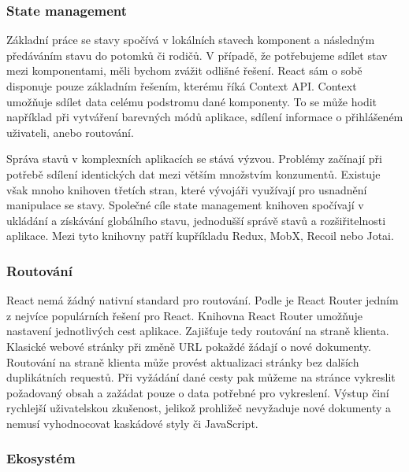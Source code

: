 \subsubsection{State management}

Základní práce se stavy spočívá v lokálních stavech komponent a následným předáváním stavu do potomků či rodičů. 
V případě, že potřebujeme sdílet stav mezi komponentami, měli bychom zvážit odlišné řešení. React sám o sobě disponuje pouze základním řešením, kterému říká Context API. 
Context umožňuje sdílet data celému podstromu dané komponenty. 
To se může hodit například při vytváření barevných módů aplikace, sdílení informace o přihlášeném uživateli, anebo routování.\cite{react}

Správa stavů v komplexních aplikacích se stává výzvou. Problémy začínají při potřebě sdílení identických dat mezi větším množstvím konzumentů. 
Existuje však mnoho knihoven třetích stran, které vývojáři využívají pro usnadnění manipulace se stavy. 
Společné cíle state management knihoven spočívají v ukládání a získávání globálního stavu, jednodušší správě stavů a rozšiřitelnosti aplikace.
Mezi tyto knihovny patří kupříkladu Redux, MobX, Recoil nebo Jotai.\cite{statemanagementreact,reactstatemanagement}

\subsubsection{Routování}

React nemá žádný nativní standard pro routování. Podle \cite{reactbanks} je React Router jedním z nejvíce populárních řešení pro React. 
Knihovna React Router umožňuje nastavení jednotlivých cest aplikace. Zajišťuje tedy routování na straně klienta. 
Klasické webové stránky při změně URL pokaždé žádají o nové dokumenty. Routování na straně klienta může provést aktualizaci stránky bez dalších duplikátních requestů. 
Při vyžádání dané cesty pak můžeme na stránce vykreslit požadovaný obsah a zažádat pouze o data potřebné pro vykreslení. 
Výstup činí rychlejší uživatelskou zkušenost, jelikož prohližeč nevyžaduje nové dokumenty a nemusí vyhodnocovat kaskádové styly či JavaScript.\cite{reactbanks,reactrouter}

\subsubsection{Ekosystém}

